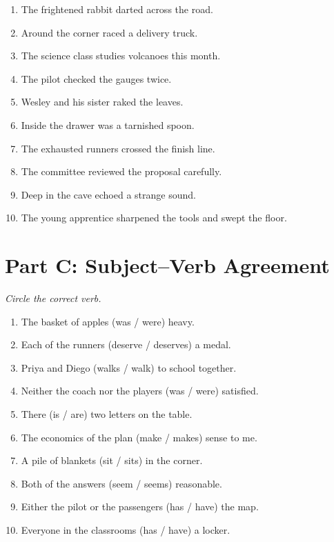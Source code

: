 \documentclass[11pt]{article}
\begin{document}
\begin{enumerate}
  \vspace{0.8in}
  \item The frightened rabbit darted across the road.
  \vspace{0.8in}
  \item Around the corner raced a delivery truck.
  \vspace{0.8in}
  \item The science class studies volcanoes this month.
  \vspace{0.8in}
  \item The pilot checked the gauges twice.
  \vspace{0.8in}
  \item Wesley and his sister raked the leaves.
  \vspace{0.8in}
  \item Inside the drawer was a tarnished spoon.
  \vspace{0.8in}
  \item The exhausted runners crossed the finish line.
  \vspace{0.8in}
  \item The committee reviewed the proposal carefully.
  \vspace{0.8in}
  \item Deep in the cave echoed a strange sound.
  \vspace{0.8in}
  \item The young apprentice sharpened the tools and swept the floor.
  \vspace{0.8in}
\end{enumerate}

\section*{Part C: Subject--Verb Agreement}
\noindent\textit{Circle the correct verb.}
\begin{enumerate}
  \item The basket of apples (was / were) heavy.
  \item Each of the runners (deserve / deserves) a medal.
  \item Priya and Diego (walks / walk) to school together.
  \item Neither the coach nor the players (was / were) satisfied.
  \item There (is / are) two letters on the table.
  \item The economics of the plan (make / makes) sense to me.
  \item A pile of blankets (sit / sits) in the corner.
  \item Both of the answers (seem / seems) reasonable.
  \item Either the pilot or the passengers (has / have) the map.
  \item Everyone in the classrooms (has / have) a locker.
\end{enumerate}
\end{document}
